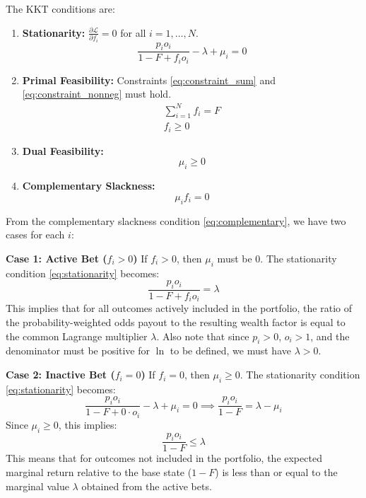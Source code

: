 \documentclass[11pt, letterpaper]{article}
\theoremstyle{definition}
\begin{document}
The KKT conditions are:
\begin{enumerate}
    \item \textbf{Stationarity:} $\frac{\partial \mathcal{L}}{\partial f_i} = 0$ for all $i=1, \dots, N$.
    \begin{equation}
        \frac{p_i o_i}{1 - F + f_i o_i} - \lambda + \mu_i = 0 \label{eq:stationarity}
    \end{equation}
    \item \textbf{Primal Feasibility:} Constraints \eqref{eq:constraint_sum} and \eqref{eq:constraint_nonneg} must hold.
    \begin{gather}
        \sum_{i=1}^N f_i = F \\
        f_i \ge 0
    \end{gather}
    \item \textbf{Dual Feasibility:}
    \begin{equation}
        \mu_i \ge 0
    \end{equation}
    \item \textbf{Complementary Slackness:}
    \begin{equation}
        \mu_i f_i = 0 \label{eq:complementary}
    \end{equation}
\end{enumerate}

From the complementary slackness condition \eqref{eq:complementary}, we have two cases for each $i$:

\textbf{Case 1: Active Bet ($f_i > 0$)}
If $f_i > 0$, then $\mu_i$ must be 0. The stationarity condition \eqref{eq:stationarity} becomes:
\begin{equation}
    \frac{p_i o_i}{1 - F + f_i o_i} = \lambda \label{eq:kkt_active}
\end{equation}
This implies that for all outcomes actively included in the portfolio, the ratio of the probability-weighted odds payout to the resulting wealth factor is equal to the common Lagrange multiplier $\lambda$. Also note that since $p_i > 0$, $o_i > 1$, and the denominator must be positive for $\ln$ to be defined, we must have $\lambda > 0$.

\textbf{Case 2: Inactive Bet ($f_i = 0$)}
If $f_i = 0$, then $\mu_i \ge 0$. The stationarity condition \eqref{eq:stationarity} becomes:
\begin{equation}
    \frac{p_i o_i}{1 - F + 0 \cdot o_i} - \lambda + \mu_i = 0 \implies \frac{p_i o_i}{1 - F} = \lambda - \mu_i
\end{equation}
Since $\mu_i \ge 0$, this implies:
\begin{equation}
    \frac{p_i o_i}{1 - F} \le \lambda \label{eq:kkt_inactive}
\end{equation}
This means that for outcomes not included in the portfolio, the expected marginal return relative to the base state ($1-F$) is less than or equal to the marginal value $\lambda$ obtained from the active bets.
\end{document}
